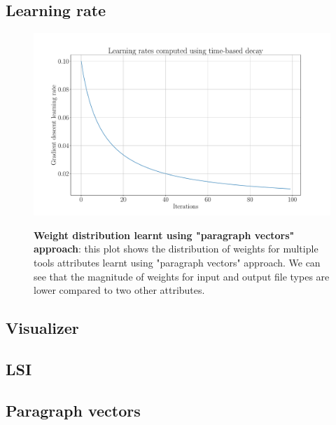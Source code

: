 \subsection{Learning rate}

\begin{figure}[h]
\begin{centering}
    {\includegraphics[scale=0.35]{figures/Learning_rates_PV.pdf}}
    \caption[Weights distribution for doc2vec]{\textbf{Weight distribution learnt using "paragraph vectors" approach}: this plot shows the distribution of weights for multiple tools attributes learnt using "paragraph vectors" approach. We can see that the magnitude of weights for input and output file types are lower compared to two other attributes.}
\end{centering}
\end{figure}


\subsection{Visualizer}
\subsection{LSI}
\subsection{Paragraph vectors}



